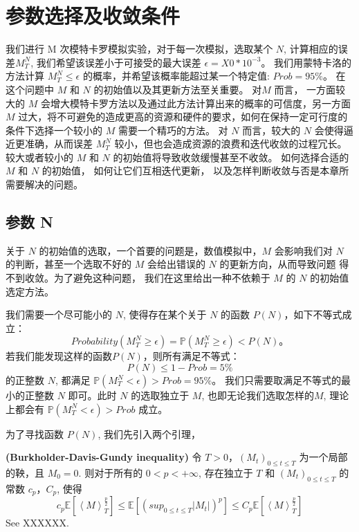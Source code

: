 \chapter{参数选择及收敛条件}
\label{chp:3}
我们进行 M 次模特卡罗模拟实验，对于每一次模拟，选取某个 $N$, 计算相应的误差$M_T^N$, 我们希望该误差小于可接受的最大误差 $\epsilon=X0*10^{-3}$。 
我们用蒙特卡洛的方法计算 $M_T^N\leq \epsilon$ 的概率，并希望该概率能超过某一个特定值: $Prob=95\%$。 
在这个问题中 $M$ 和 $N$ 的初始值以及其更新方法至关重要。 对$M$ 而言， 一方面较大的 $M$ 会增大模特卡罗方法以及通过此方法计算出来的概率的可信度，另一方面
$M$ 过大，将不可避免的造成更高的资源和硬件的要求，如何在保持一定可行度的条件下选择一个较小的 $M$ 需要一个精巧的方法。
对 $N$ 而言，较大的 $N$ 会使得逼近更准确，从而误差 $M_T^N$ 较小，但也会造成资源的浪费和迭代收敛的过程冗长。
较大或者较小的 $M$ 和 $N$ 的初始值将导致收敛缓慢甚至不收敛。
如何选择合适的 $M$ 和 $N$ 的初始值，
如何让它们互相迭代更新， 以及怎样判断收敛与否是本章所需要解决的问题。
\section{参数 N} %
\label{sec:N}
关于 $N$ 的初始值的选取，一个首要的问题是，数值模拟中，$M$ 会影响我们对 $N$ 的判断，甚至一个选取不好的 $M$ 会给出错误的 $N$ 的更新方向，从而导致问题
得不到收敛。为了避免这种问题， 我们在这里给出一种不依赖于 $M$ 的 $N$ 的初始值选定方法。

我们需要一个尽可能小的 $N$, 使得存在某个关于 $N$ 的函数 $P(N)$，如下不等式成立：
\begin{equation}
Probability(M_T^N\geq\epsilon)=\mathbb{P}(M_T^N\geq\epsilon)<P(N)。
\end{equation}
若我们能发现这样的函数$P(N)$，则所有满足不等式：
\begin{equation}
P(N)\leq 1-Prob=5\% 
\end{equation}
的正整数 $N$, 都满足 $\mathbb{P}(M_T^N<\epsilon)>Prob=95\%$。
我们只需要取满足不等式的最小的正整数 $N$ 即可。此时 $N$ 的选取独立于 $M$, 也即无论我们选取怎样的$M$, 理论上都会有 $\mathbb{P}(M_T^N<\epsilon)>Prob$ 成立。

为了寻找函数 $P(N)$, 我们先引入两个引理，

\textbf{(Burkholder-Davis-Gundy inequality)}
令 $T>0$，$(M_t)_{0\leq t\leq T}$ 为一个局部的鞅，且 $M_0=0$. 则对于所有的 $0<p<+\infty$, 存在独立于 $T$ 和 $(M_t)_{0\leq t\leq T}$ 的常数
$c_p$，$C_p$, 使得 
\begin{equation}
c_p\mathbb{E}[\left \langle M \right \rangle_T^{\frac{p}{2}}]\leq \mathbb{E}[(sup_{0\leq t\leq T}|M_t|)^p]\leq C_p\mathbb{E}[\left \langle M \right \rangle_T^{\frac{p}{2}}]
\end{equation}
See XXXXXX.

